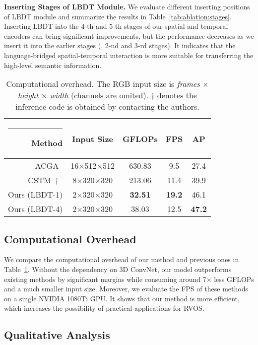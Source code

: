 \documentclass[10pt,twocolumn,letterpaper]{article}
\makeatletter
\newcommand{\thickhline}{\noalign {\ifnum 0=`}\fi \hrule height 1pt
	\futurelet \reserved@a \@xhline
}
\newcommand{\tablestyle}[2]{\setlength{\tabcolsep}{#1}\renewcommand{\arraystretch}{#2}\centering\footnotesize}
\makeatother
\begin{document}
\textbf{Inserting Stages of LBDT Module.} We evaluate different inserting positions of LBDT module and summarize the results in Table~\ref{tab:ablation:stages}. Inserting LBDT into the $4$-th and $5$-th stages of our spatial and temporal encoders can bring significant improvements, but the performance decreases as we insert it into the earlier stages (\ie, $2$-nd and $3$-rd stages). It indicates that the language-bridged spatial-temporal interaction is more suitable for transferring the high-level semantic information.


\begin{table}[!htbp]
    \centering
    {
    \tablestyle{7pt}{1.14}\begin{tabular}{r||c|c|c|c}
    \hline\thickhline
    \rowcolor{mygray}
    Method & Input Size & GFLOPs & FPS & AP \\ \hline\hline
    ACGA~\cite{WangDYT19} & 16$\times$512$\times$512 & 630.83 & 9.5 & 27.4 \\
    CSTM~$\dag$~\cite{HuiH0DLWH021} & 8$\times$320$\times$320 & 213.06 & 11.4 & 39.9 \\ \hline\hline
    Ours (LBDT-1) & 2$\times$320$\times$320 & \textbf{32.51} & \textbf{19.2} & 46.1\\ 
    Ours (LBDT-4) & 2$\times$320$\times$320 & 38.03 & 12.5  & \textbf{47.2} \\ \hline
    \end{tabular}
    }
    \caption{Computational overhead. The RGB input size is \textit{frames} $\times$ \textit{height} $\times$ \textit{width} (channels are omited). $\dag$ denotes the inference code is obtained by contacting the authors.}
\label{tab:ablation:flops}
\end{table}

\subsection{Computational Overhead}
We compare the computational overhead of our method and previous ones in Table~\ref{tab:ablation:flops}. Without the dependency on 3D ConvNet, our model outperforms existing methods by significant margins while consuming around 7$\times$ less GFLOPs and a much smaller input size. Moreover, we evaluate the FPS of these methods on a single NVIDIA 1080Ti GPU. It shows that our method is more efficient, which increases the possibility of practical applications for RVOS.

\subsection{Qualitative Analysis}
\label{exp:visualize}
\end{document}
